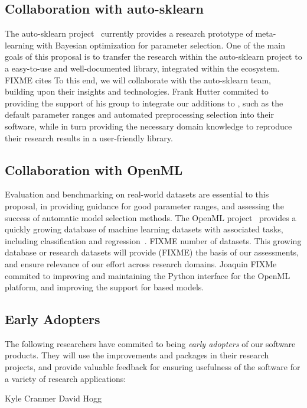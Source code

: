 \subsection{Collaboration with auto-sklearn}
The auto-sklearn project~\autocite{feurer-nips2015} currently provides a research
prototype of meta-learning with Bayesian optimization for parameter selection.
One of the main goals of this proposal is to transfer the research within the
auto-sklearn project to a easy-to-use and well-documented library, integrated
within the \sklearn{} ecosystem. FIXME cites To this end, we will collaborate
with the auto-sklearn team, building upon their insights and technologies.
Frank Hutter commited to providing the support of his group to integrate our
additions to \sklearn{}, such as the default parameter ranges and automated
preprocessing selection into their software, while in turn providing the
necessary domain knowledge to reproduce their research results in a
user-friendly library.

\subsection{Collaboration with OpenML}
Evaluation and benchmarking on real-world datasets are essential to this proposal, in providing
guidance for good parameter ranges, and assessing the success of automatic model selection methods.
The OpenML project~\autocite{van2013openml} provides a quickly growing database of machine learning datasets with associated
tasks, including classification and regression~\autocite{vanschoren2014openml}. FIXME number of datasets.
This growing database or research datasets will provide (FIXME) the basis of our assessments, and
ensure relevance of our effort across research domains.
Joaquin FIXMe commited to improving and maintaining the Python interface for the OpenML platform,
and improving the support for \sklearn{} based models.

\subsection{Early Adopters}
The following researchers have commited to being \emph{early adopters} of our software
products. They will use the improvements and packages in their research projects,
and provide valuable feedback for ensuring usefulness of the software for a
variety of research applications:

Kyle Cranmer
David Hogg

